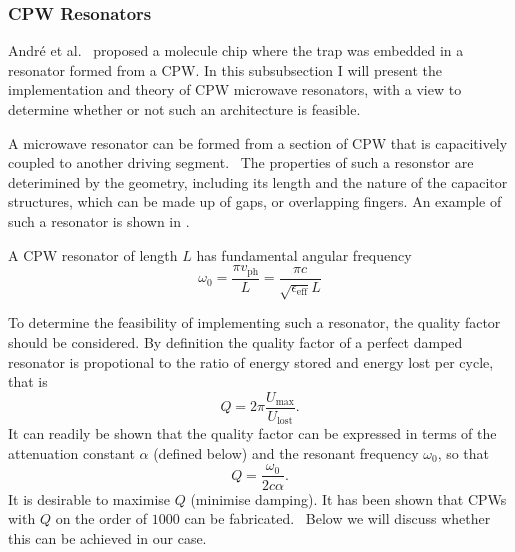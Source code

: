 \begin{figure}
  \caption{
  }
  \label{experiment:fig:CPWtaper}
\end{figure}

\subsubsection{CPW Resonators}

Andr\'e et al.~\cite{Andre2006} proposed a molecule chip where the trap was
embedded in a resonator formed from a CPW. In this subsubsection I will present
the implementation and theory of CPW microwave resonators, with a view to
determine whether or not such an architecture is feasible.

A microwave resonator can be formed from a section of CPW that is capacitively
coupled to another driving segment.~\cite{Day2003} The properties of such a
resonstor are deterimined by the geometry, including its length and the nature
of the capacitor structures, which can be made up of gaps, or overlapping
fingers. An example of such a resonator is shown in
.~\cite{doi:10.1063/1.3010859} 

\begin{figure}
  \caption{
  }
  \label{experiment:fig:resonator}
\end{figure}

A CPW resonator of length $L$ has fundamental angular frequency
\begin{equation}
  \omega_0 = \frac{\pi v_\mathrm{ph}}{L} = \frac{\pi
  c}{\sqrt{\epsilon_\text{eff}} L}
\end{equation}

To determine the feasibility of implementing such a resonator, the quality
factor should be considered. By definition the quality factor of a perfect
damped resonator is propotional to the ratio of energy stored and energy lost
per cycle, that is~
\begin{equation}
  Q = 2\pi\frac{U_\mathrm{max}}{U_\mathrm{lost}}.
  \label{experiment:mw:eqn:Qdef}
\end{equation}
It can readily be shown that the quality factor can be expressed in terms of the
attenuation constant $\alpha$ (defined below) and the resonant frequency
$\omega_0$, so that~\cite{Simons2004}
\begin{equation}
  Q = \frac{\omega_0}{2c\alpha}.
  \label{experiment:mw:eqn:Qalpha}
\end{equation}
It is desirable to maximise $Q$ (minimise damping). It has been shown that CPWs
with $Q$ on the order of $1000$ can be fabricated.~ Below we will discuss whether this can be achieved in our case.

